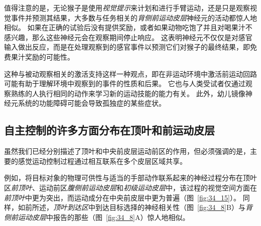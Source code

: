 值得注意的是，无论猴子是使用\textit{视觉提示}来计划和进行手臂运动，还是只是观察视觉事件并预测其结果，大多数与任务相关的\textit{背侧前运动皮层}神经元的活动都惊人地相似。
如果在正确的试验后没有提供奖励，或者如果动物吃饱了并且对喝果汁不感兴趣，那么这些神经元会在观察期间停止响应。
这表明神经元不仅仅是对感官输入做出反应，而是在处理观察到的感官事件以预测它们对猴子的最终结果，即免费果汁奖励的可能性。


这种与被动观察相关的激活支持这样一种观点，即在非运动环境中激活前运动回路可能有助于理解环境中观察到的事件的性质和后果。
它也与人类受试者仅通过观察熟练的人执行相同的动作来学习新的运动技能的能力有关。
此外，幼儿镜像神经元系统的功能障碍可能会导致孤独症的某些症状。



\subsection{自主控制的许多方面分布在顶叶和前运动皮层}

虽然我们已经分别描述了顶叶和中央前皮层运动前区的作用，但必须强调的是，主要的感觉运动控制过程通过相互联系在多个皮层区域共享。


例如，将目标对象的物理可供性与适当的手部动作联系起来的神经过程分布在顶叶区\textit{前顶叶}、运动前区\textit{腹侧前运动皮层}和\textit{初级运动皮层}中，该过程的视觉空间方面在 \textit{前顶叶}中更为突出，而运动成分在中央前皮层中更为普遍（图~\ref{fig:34_15}）。 
同样，如前所述，\textit{顶叶到达区}中到达目标选择的神经相关性（图~\ref{fig:34_8}B）与\textit{背侧前运动皮层}中报告的那些（图~\ref{fig:34_8}A）惊人地相似。


